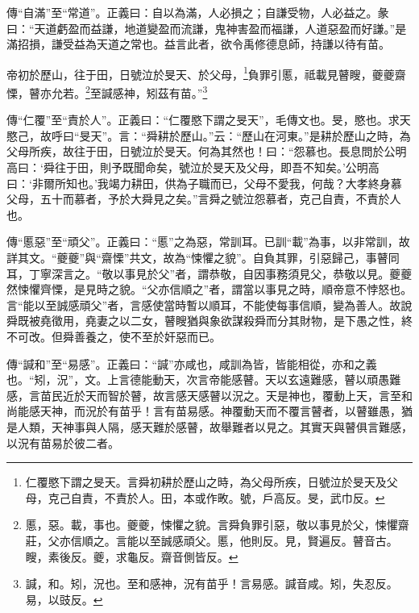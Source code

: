 {\noindent\zhuan{}\fzbyks 傳“自滿”至“常道”。正義曰：自以為滿，人必損之；自謙受物，人必益之。彖曰：“天道虧盈而益謙，地道變盈而流謙，鬼神害盈而福謙，人道惡盈而好謙。”是滿招損，謙受益為天道之常也。益言此者，欲令禹修德息師，持謙以待有苗。 \par}

帝初於歷山，往于田，日號泣於旻天、於父母，\footnote{仁覆愍下謂之旻天。言舜初耕於歷山之時，為父母所疾，日號泣於旻天及父母，克己自責，不責於人。田，本或作畋。號，戶高反。旻，武巾反。}負罪引慝，祗載見瞽瞍，夔夔齋慄，瞽亦允若。\footnote{慝，惡。載，事也。夔夔，悚懼之貌。言舜負罪引惡，敬以事見於父，悚懼齋莊，父亦信順之。言能以至誠感頑父。慝，他則反。見，賢遍反。瞽音古。瞍，素後反。夔，求龜反。齋音側皆反。}至諴感神，矧茲有苗。”\footnote{諴，和。矧，況也。至和感神，況有苗乎！言易感。諴音咸。矧，失忍反。易，以豉反。}

{\noindent\zhuan{}\fzbyks 傳“仁覆”至“責於人”。正義曰：“仁覆愍下謂之旻天”，毛傳文也。旻，愍也。求天愍己，故呼曰“旻天”。言：“舜耕於歷山。”云：“歷山在河東。”是耕於歷山之時，為父母所疾，故往于田，日號泣於旻天。何為其然也！曰：“怨慕也。長息問於公明高曰：‘舜往于田，則予既聞命矣，號泣於旻天及父母，即吾不知矣。’公明高曰：‘非爾所知也。’我竭力耕田，供為子職而已，父母不愛我，何哉？大孝終身慕父母，五十而慕者，予於大舜見之矣。”言舜之號泣怨慕者，克己自責，不責於人也。 \par}

{\noindent\zhuan{}\fzbyks 傳“慝惡”至“頑父”。正義曰：“慝”之為惡，常訓耳。已訓“載”為事，以非常訓，故詳其文。“夔夔”與“齋慄”共文，故為“悚懼之貌”。自負其罪，引惡歸己，事瞽同耳，丁寧深言之。“敬以事見於父”者，謂恭敬，自因事務須見父，恭敬以見。夔夔然悚懼齊慄，是見時之貌。“父亦信順之”者，謂當以事見之時，順帝意不悖怒也。言“能以至誠感頑父”者，言感使當時暫以順耳，不能使每事信順，變為善人。故說舜既被堯徵用，堯妻之以二女，瞽瞍猶與象欲謀殺舜而分其財物，是下愚之性，終不可改。但舜善養之，使不至於奸惡而已。 \par}

{\noindent\zhuan{}\fzbyks 傳“諴和”至“易感”。正義曰：“諴”亦咸也，咸訓為皆，皆能相從，亦和之義也。“矧，況”，文。上言德能動天，次言帝能感瞽。天以玄遠難感，瞽以頑愚難感，言苗民近於天而智於瞽，故言感天感瞽以況之。天是神也，覆動上天，言至和尚能感天神，而況於有苗乎！言有苗易感。神覆動天而不覆言瞽者，以瞽雖愚，猶是人類，天神事與人隔，感天難於感瞽，故舉難者以見之。其實天與瞽俱言難感，以況有苗易於彼二者。 \par}


